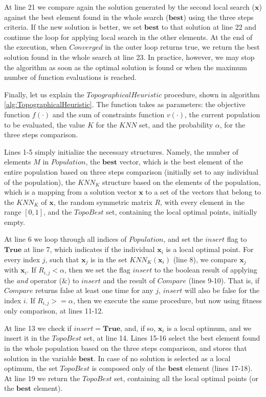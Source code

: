 At line 21 we compare again the solution generated by the second local search ($\bm{x}$) against the best element found in the whole search ($\bm{best}$) using the three steps criteria. If the new solution is better, we set $\bm{best}$ to that solution at line 22 and continue the loop for applying local search in the other elements. At the end of the execution, when $Converged$ in the outer loop returns true, we return the best solution found in the whole search at line 23. In practice, however, we may stop the algorithm as soon as the optimal solution is found or when the maximum number of function evaluations is reached.

Finally, let us explain the $TopographicalHeuristic$ procedure, shown in algorithm \ref{alg:TopographicalHeuristic}. The function takes as parameters: the objective function $f(\cdot)$ and the sum of constraints function $v(\cdot)$, the current population to be evaluated, the value $K$ for the $KNN$ set, and the probability $\alpha$, for the three steps comparison.





Lines 1-5 simply initialize the necessary structures. Namely, the number of elements $M$ in $Population$, the $\bm{best}$ vector, which is the best element of the entire population based on three steps comparison (initially set to any individual of the population), the $KNN_K$ structure based on the elements of the population, which is a mapping from a solution vector $\bm{x}$ to a set of the vectors that belong to the $KNN_K$ of $\bm{x}$, the random symmetric matrix $R$, with every element in the range $[0, 1]$, and the $TopoBest$ set, containing the local optimal points, initially empty.

At line 6 we loop through all indices of $Population$, and set the $insert$ flag to $\bm{True}$ at line 7, which indicates if the individual $\bm{x}_i$ is a local optimal point. For every index $j$, such that $\bm{x}_j$ is in the set $KNN_K(\bm{x}_i)$ (line 8), we compare $\bm{x}_j$ with $\bm{x}_i$. If $R_{i, j} < \alpha$, then we set the flag $insert$ to the boolean result of applying the \textit{and} operator ($\&$) to $insert$ and the result of $Compare$ (lines 9-10). That is, if $Compare$ returns false at least one time for any $j$, $insert$ will also be false for the index $i$. If $R_{i, j} >= \alpha$, then we execute the same procedure, but now using fitness only comparison, at lines 11-12.

At line 13 we check if $insert = \bm{True}$, and, if so, $\bm{x}_i$ is a local optimum, and we insert it in the $TopoBest$ set, at line 14. Lines 15-16 select the best element found in the whole population based on the three steps comparison, and stores that solution in the variable $\bm{best}$. In case of no solution is selected as a local optimum, the set $TopoBest$ is composed only of the $\bm{best}$ element (lines 17-18). At line 19 we return the $TopoBest$ set, containing all the local optimal points (or the $\bm{best}$ element).


